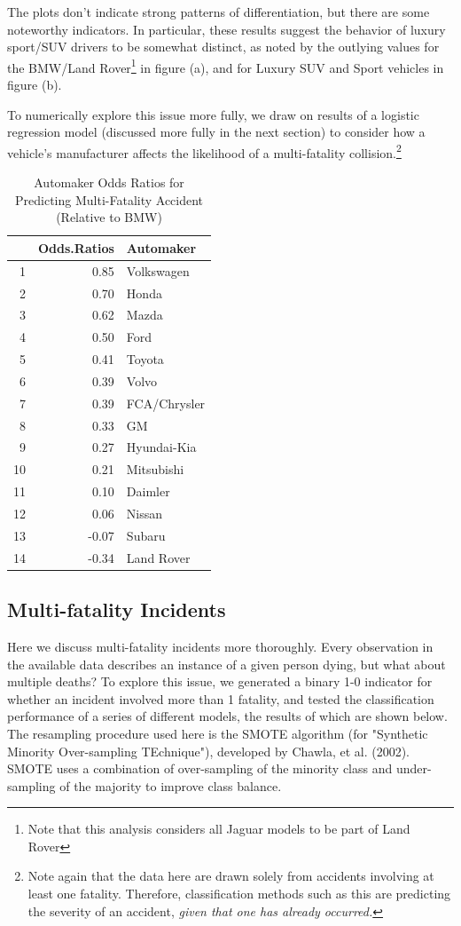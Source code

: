 \documentclass[11pt, oneside,titlepage]{article}   	%
\begin{document}
The plots don't indicate strong patterns of differentiation, but there are some noteworthy indicators. In particular, these results suggest the behavior of luxury sport/SUV drivers to be somewhat distinct, as noted by the outlying values for the BMW/Land Rover\footnote{Note that this analysis considers all Jaguar models to be part of Land Rover} in figure (a), and for Luxury SUV and Sport vehicles in figure (b).

To numerically explore this issue more fully, we draw on results of a logistic regression model (discussed more fully in the next section) to consider how a vehicle's manufacturer affects the likelihood of a multi-fatality collision.\footnote{Note again that the data here are drawn solely from accidents involving at least one fatality. Therefore, classification methods such as this are predicting the severity of an accident, \textit{given that one has already occurred.}}


\begin{table}[ht]
\centering
\begin{tabular}{rrl}
  \hline
 & Odds.Ratios & Automaker \\ 
  \hline
1 & 0.85 & Volkswagen \\ 
  2 & 0.70 & Honda \\ 
  3 & 0.62 & Mazda \\ 
  4 & 0.50 & Ford \\ 
  5 & 0.41 & Toyota \\ 
  6 & 0.39 & Volvo \\ 
  7 & 0.39 & FCA/Chrysler \\ 
  8 & 0.33 & GM \\ 
  9 & 0.27 & Hyundai-Kia \\ 
  10 & 0.21 & Mitsubishi \\ 
  11 & 0.10 & Daimler \\ 
  12 & 0.06 & Nissan \\ 
  13 & -0.07 & Subaru \\ 
  14 & -0.34 & Land Rover \\ 
   \hline
\end{tabular}
\caption{Automaker Odds Ratios for Predicting Multi-Fatality Accident (Relative to BMW)} 
\end{table}

\subsection*{Multi-fatality Incidents}
Here we discuss multi-fatality incidents more thoroughly. Every observation in the available data describes an instance of a given person dying, but what about multiple deaths? To explore this issue, we generated a binary 1-0 indicator for whether an incident involved more than 1 fatality, and tested the classification performance of a series of different models, the results of which are shown below. The resampling procedure used here is the SMOTE algorithm (for "Synthetic Minority Over-sampling TEchnique"), developed by Chawla, et al. (2002). SMOTE uses a combination of over-sampling of the minority class and under-sampling of the majority to improve class balance. \\
\end{document}
